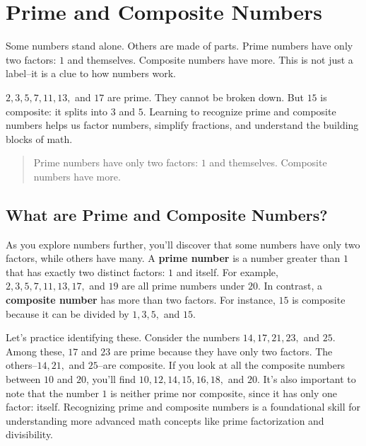 \cleardoublepage

\section{Prime and Composite Numbers}

Some numbers stand alone. Others are made of parts. Prime numbers have only two
factors: \(1\) and themselves. Composite numbers have more. This is not just a
label--it is a clue to how numbers work.

\(2, 3, 5, 7, 11, 13,\) and \(17\) are prime. They cannot be broken down. But
\(15\) is composite: it splits into \(3\) and \(5\). Learning to recognize prime
and composite numbers helps us factor numbers, simplify fractions, and understand
the building blocks of math.

\blockquote{Prime numbers have only two factors: \(1\) and 
themselves. Composite numbers have more.}

\subsection{What are Prime and Composite Numbers?}

As you explore numbers further, you'll discover that some numbers have only two
factors, while others have many. A \textbf{prime number} is a number greater than
\(1\) that has exactly two distinct factors: \(1\) and itself. For example, \(2,
3, 5, 7, 11, 13, 17,\) and \(19\) are all prime numbers under \(20\). In
contrast, a \textbf{composite number} has more than two factors. For instance,
\(15\) is composite because it can be divided by \(1, 3, 5,\) and \(15\).

Let's practice identifying these. Consider the numbers \(14, 17, 21, 23,\) and
\(25\). Among these, \(17\) and \(23\) are prime because they have only two
factors. The others--\(14, 21,\) and \(25\)--are composite. If you look at all
the composite numbers between \(10\) and \(20\), you'll find \(10, 12, 14, 15,
16, 18,\) and \(20\). It's also important to note that the number \(1\) is
neither prime nor composite, since it has only one factor: itself. Recognizing
prime and composite numbers is a foundational skill for understanding more
advanced math concepts like prime factorization and divisibility.




% 
% 
% 